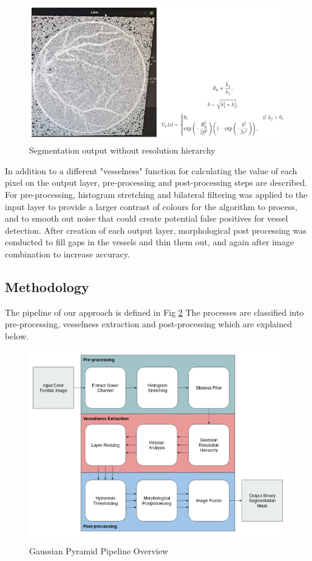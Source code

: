 \documentclass[conference]{IEEEtran}
\begin{document}
\begin{figure}[H]
	\centering
	\includegraphics[width=\linewidth]{image/fig1.PNG}
	\caption{Segmentation output without resolution hierarchy}
	\label{fig:fig1}
\end{figure}

\par

In addition to a different "vesselness" function for calculating the value of each pixel on the output layer, pre-processing and post-processing steps are described. For pre-processing, histogram stretching and bilateral filtering was applied to the input layer to provide a larger contrast of colours for the algorithm to process, and to smooth out noise that could create potential false positives for vessel detection. After creation of each output layer, morphological post processing was conducted to fill gaps in the vessels and thin them out, and again after image combination to increase accuracy.


\subsection{Methodology}
\label{ssec:gmethod}

The pipeline of our approach is defined in Fig \ref{fig:gaussian} The processes are classified into pre-processing, vesselness extraction and post-processing which are explained below.

\begin{figure}[t]
	\centering
	\includegraphics[scale=0.7]{image/gaussian.PNG}
	\caption{Gaussian Pyramid Pipeline Overview}
	\label{fig:gaussian}
\end{figure}
\end{document}
